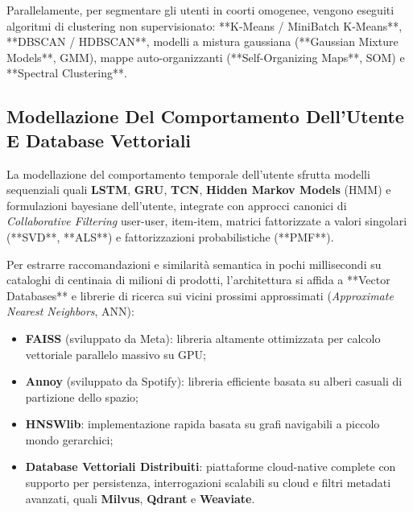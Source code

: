 \documentclass[11pt, a4paper]{article}
\begin{document}
Parallelamente, per segmentare gli utenti in coorti omogenee, vengono eseguiti algoritmi di clustering non supervisionato: **K-Means / MiniBatch K-Means**, **DBSCAN / HDBSCAN**, modelli a mistura gaussiana (**Gaussian Mixture Models**, GMM), mappe auto-organizzanti (**Self-Organizing Maps**, SOM) e **Spectral Clustering**.


\subsection{Modellazione Del Comportamento Dell'Utente E Database Vettoriali}

La modellazione del comportamento temporale dell'utente sfrutta modelli sequenziali quali \textbf{LSTM}, \textbf{GRU}, \textbf{TCN}, \textbf{Hidden Markov Models} (HMM) e formulazioni bayesiane dell'utente, integrate con approcci canonici di \emph{Collaborative Filtering} user-user, item-item, matrici fattorizzate a valori singolari (**SVD**, **ALS**) e fattorizzazioni probabilistiche (**PMF**).

Per estrarre raccomandazioni e similarità semantica in pochi millisecondi su cataloghi di centinaia di milioni di prodotti, l'architettura si affida a **Vector Databases** e librerie di ricerca sui vicini prossimi approssimati (\emph{Approximate Nearest Neighbors}, ANN):
\begin{itemize}
    \item \textbf{FAISS} (sviluppato da Meta): libreria altamente ottimizzata per calcolo vettoriale parallelo massivo su GPU;
    \item \textbf{Annoy} (sviluppato da Spotify): libreria efficiente basata su alberi casuali di partizione dello spazio;
    \item \textbf{HNSWlib}: implementazione rapida basata su grafi navigabili a piccolo mondo gerarchici;
    \item \textbf{Database Vettoriali Distribuiti}: piattaforme cloud-native complete con supporto per persistenza, interrogazioni scalabili su cloud e filtri metadati avanzati, quali \textbf{Milvus}, \textbf{Qdrant} e \textbf{Weaviate}.
\end{itemize}

\newpage

\end{document}
